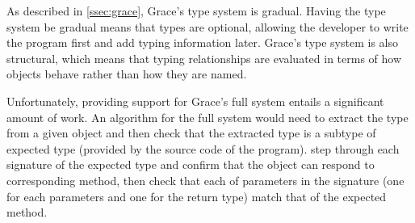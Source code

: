 
As described in \cref{ssec:grace},
Grace's type system is gradual. 
Having the type system be gradual means that types are optional,
allowing the developer to write the program first and add typing information later. 
Grace's type system is also structural, 
which means that typing relationships are evaluated
in terms of how objects behave rather than how they are named. 

Unfortunately, providing support for Grace's full system entails a significant amount of work.
An algorithm for the full system would need to extract the type from a given object and then check that
the extracted type is a subtype of expected type (provided by the source code of the program). step through
each signature of the expected type and confirm that the object can respond to corresponding method, 
then check that each of parameters in the signature
(one for each parameters and one for the return type)
match that of the expected method.

